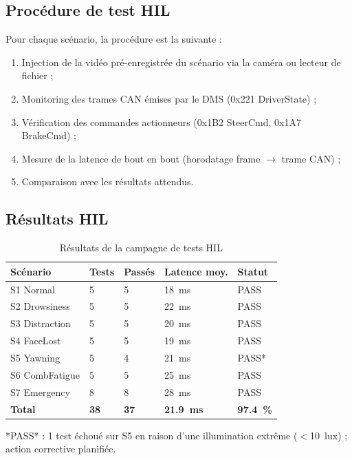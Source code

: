 \documentclass[12pt,a4paper]{report}
\begin{document}
\subsection{Proc\'edure de test HIL}

Pour chaque sc\'enario, la proc\'edure est la suivante :
\begin{enumerate}
  \item Injection de la vid\'eo pr\'e-enregistr\'ee du sc\'enario via la cam\'era ou lecteur de fichier ;
  \item Monitoring des trames CAN \'emises par le DMS (0x221 DriverState) ;
  \item V\'erification des commandes actionneurs (0x1B2 SteerCmd, 0x1A7 BrakeCmd) ;
  \item Mesure de la latence de bout en bout (horodatage frame $\to$ trame CAN) ;
  \item Comparaison avec les r\'esultats attendus.
\end{enumerate}

\subsection{R\'esultats HIL}

\begin{table}[H]
\centering
\caption{R\'esultats de la campagne de tests HIL}
\label{tab:hil_results}
\begin{tabular}{L{3cm} C{1.8cm} C{1.8cm} C{2.5cm} C{2cm}}
\toprule
\textbf{Sc\'enario} & \textbf{Tests} & \textbf{Pass\'es} & \textbf{Latence moy.} & \textbf{Statut} \\
\midrule
S1 Normal & 5 & 5 & 18~ms & PASS \\
S2 Drowsiness & 5 & 5 & 22~ms & PASS \\
S3 Distraction & 5 & 5 & 20~ms & PASS \\
S4 FaceLost & 5 & 5 & 19~ms & PASS \\
S5 Yawning & 5 & 4 & 21~ms & PASS* \\
S6 CombFatigue & 5 & 5 & 25~ms & PASS \\
S7 Emergency & 8 & 8 & 28~ms & PASS \\
\textbf{Total} & \textbf{38} & \textbf{37} & \textbf{21.9~ms} & \textbf{97.4~\%} \\
\bottomrule
\end{tabular}
\end{table}

\noindent\footnotesize{*PASS* : 1 test \'echou\'e sur S5 en raison d'une illumination extr\^eme ($<$10~lux) ; action corrective planifi\'ee.}
\end{document}

